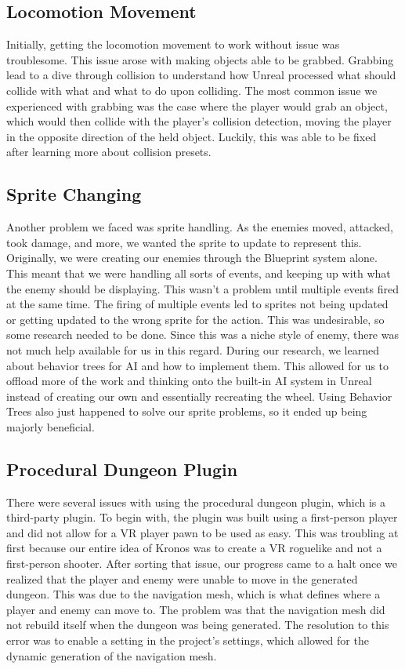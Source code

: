 \documentclass{sigchi}
\begin{document}
\subsection*{Locomotion Movement}
Initially, getting the locomotion movement to work without issue was troublesome. This issue arose with making objects able to be grabbed. Grabbing lead to a dive through collision to understand how Unreal processed what should collide with what and what to do upon colliding. The most common issue we experienced with grabbing was the case where the player would grab an object, which would then collide with the player's collision detection, moving the player in the opposite direction of the held object. Luckily, this was able to be fixed after learning more about collision presets.
\subsection*{Sprite Changing}
Another problem we faced was sprite handling. As the enemies moved, attacked, took damage, and more, we wanted the sprite to update to represent this. Originally, we were creating our enemies through the Blueprint system alone. This meant that we were handling all sorts of events, and keeping up with what the enemy should be displaying. This wasn't a problem until multiple events fired at the same time. The firing of multiple events led to sprites not being updated or getting updated to the wrong sprite for the action. This was undesirable, so some research needed to be done. Since this was a niche style of enemy, there was not much help available for us in this regard. During our research, we learned about behavior trees for AI and how to implement them. This allowed for us to offload more of the work and thinking onto the built-in AI system in Unreal instead of creating our own and essentially recreating the wheel. Using Behavior Trees also just happened to solve our sprite problems, so it ended up being majorly beneficial.
\subsection*{Procedural Dungeon Plugin}
There were several issues with using the procedural dungeon plugin, which is a third-party plugin. To begin with, the plugin was built using a first-person player and did not allow for a VR player pawn to be used as easy. This was troubling at first because our entire idea of Kronos was to create a VR roguelike and not a first-person shooter. After sorting that issue, our progress came to a halt once we realized that the player and enemy were unable to move in the generated dungeon.  This was due to the navigation mesh, which is what defines where a player and enemy can move to. The problem was that the navigation mesh did not rebuild itself when the dungeon was being generated. The resolution to this error was to enable a setting in the project's settings, which allowed for the dynamic generation of the navigation mesh.
\end{document}
